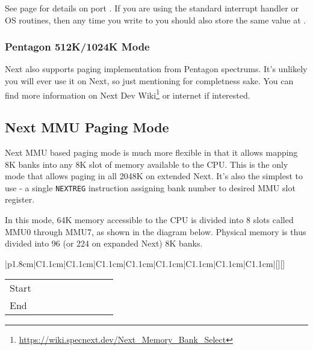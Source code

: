 See page  for details on port . If you are using the standard interrupt handler or OS routines, then any time you write to  you should also store the same value at .


\subsubsection{Pentagon 512K/1024K Mode}

Next also supports paging implementation from Pentagon spectrums. It's unlikely you will ever use it on Next, so just mentioning for completness sake. You can find more information on Next Dev Wiki\footnote{\url{https://wiki.specnext.dev/Next_Memory_Bank_Select}} or internet if interested.


\pagebreak
\subsection{Next MMU Paging Mode}

Next MMU based paging mode is much more flexible in that it allows mapping 8K banks into any 8K slot of memory available to the CPU. This is the only mode that allows paging in all 2048K on extended Next. It's also the simplest to use - a single {\tt NEXTREG} instruction assigning bank number to desired MMU slot register.

In this mode, 64K memory accessible to the CPU is divided into 8 slots called MMU0 through MMU7, as shown in the diagram below. Physical memory is thus divided into 96 (or 224 on expanded Next) 8K banks.

\begin{ElegantTable}{|p{1.8cm}|C{1.1cm}|C{1.1cm}|C{1.1cm}|C{1.1cm}|C{1.1cm}|C{1.1cm}|C{1.1cm}|C{1.1cm}|}[][]
\end{ElegantTable}

\vspace*{-0.75em}

\begin{tabular}{|p{1.8cm}|C{1.1cm}|C{1.1cm}|C{1.1cm}|C{1.1cm}|C{1.1cm}|C{1.1cm}|C{1.1cm}|C{1.1cm}|}
	\hline
	Start	& 	& 	& 	& 	& 	& 	& 	&  \\
	End		& 	& 	& 	& 	& 	& 	& 	&  \\
	\hline
\end{tabular}


